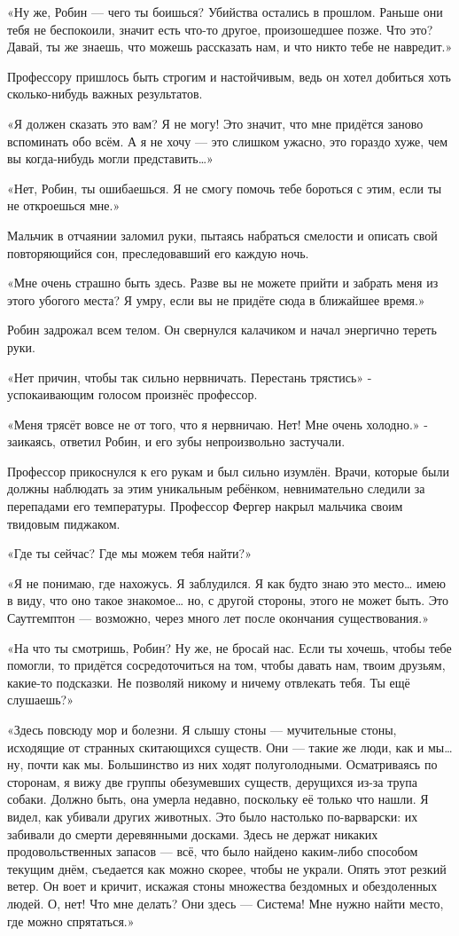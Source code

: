 \documentclass[a5paper, 9pt,
final, openany, twoside=true]{memoir}
\begin{document}
«Ну же, Робин — чего ты боишься? Убийства остались в прошлом. Раньше они тебя не беспокоили, значит есть что-то другое, произошедшее позже. Что это? Давай, ты же знаешь, что можешь рассказать нам, и что никто тебе не навредит.»

Профессору пришлось быть строгим и настойчивым, ведь он хотел добиться хоть сколько-нибудь важных результатов.

«Я должен сказать это вам? Я не могу! Это значит, что мне придётся заново вспоминать обо всём. А я не хочу — это слишком ужасно, это гораздо хуже, чем вы когда-нибудь могли представить…»

«Нет, Робин, ты ошибаешься. Я не смогу помочь тебе бороться с этим, если ты не откроешься мне.»

Мальчик в отчаянии заломил руки, пытаясь набраться смелости и описать свой повторяющийся сон, преследовавший его каждую ночь.

«Мне очень страшно быть здесь. Разве вы не можете прийти и забрать меня из этого убогого места? Я умру, если вы не придёте сюда в ближайшее время.»

Робин задрожал всем телом. Он свернулся калачиком и начал энергично тереть руки.

«Нет причин, чтобы так сильно нервничать. Перестань трястись» - успокаивающим голосом произнёс профессор.

«Меня трясёт вовсе не от того, что я нервничаю. Нет! Мне очень холодно.» - заикаясь, ответил Робин, и его зубы непроизвольно застучали.

Профессор прикоснулся к его рукам и был сильно изумлён. Врачи, которые были должны наблюдать за этим уникальным ребёнком, невнимательно следили за перепадами его температуры. Профессор Фергер накрыл мальчика своим твидовым пиджаком.

«Где ты сейчас? Где мы можем тебя найти?»

«Я не понимаю, где нахожусь. Я заблудился. Я как будто знаю это место… имею в виду, что оно такое знакомое… но, с другой стороны, этого не может быть. Это Саутгемптон — возможно, через много лет после окончания существования.»\bigskip

«На что ты смотришь, Робин? Ну же, не бросай нас. Если ты хочешь, чтобы тебе помогли, то придётся сосредоточиться на том, чтобы давать нам, твоим друзьям, какие-то подсказки. Не позволяй никому и ничему отвлекать тебя. Ты ещё слушаешь?»

«Здесь повсюду мор и болезни. Я слышу стоны — мучительные стоны, исходящие от странных скитающихся существ. Они — такие же люди, как и мы… ну, почти как мы. Большинство из них ходят полуголодными. Осматриваясь по сторонам, я вижу две группы обезумевших существ, дерущихся из-за трупа собаки. Должно быть, она умерла недавно, поскольку её только что нашли. Я видел, как убивали других животных. Это было настолько по-варварски: их забивали до смерти деревянными досками. Здесь не держат никаких продовольственных запасов — всё, что было найдено каким-либо способом текущим днём, съедается как можно скорее, чтобы не украли. Опять этот резкий ветер. Он воет и кричит, искажая стоны множества бездомных и обездоленных людей. О, нет! Что мне делать? Они здесь — Система! Мне нужно найти место, где можно спрятаться.»\bigskip
\end{document}
